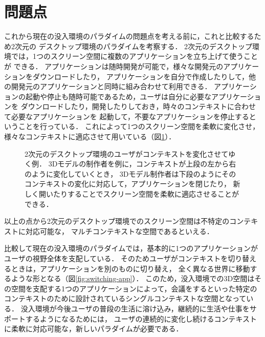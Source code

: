 \section{問題点}
\label{section:intro:problem}

これから現在の没入環境のパラダイムの問題点を考える前に，これと比較するため2次元の
デスクトップ環境のパラダイムを考察する．
2次元のデスクトップ環境では，1つのスクリーン空間に複数のアプリケーションを立ち上げて使うことが
できる．
アプリケーションは随時開発が可能で，様々な開発元のアプリケーションをダウンロードしたり，
アプリケーションを自分で作成したりして，他の開発元のアプリケーションと同時に組み合わせて利用できる．
アプリケーションの起動や停止も随時可能であるため，ユーザは自分に必要なアプリケーションを
ダウンロードしたり，開発したりしておき，時々のコンテキストに合わせて必要なアプリケーションを
起動して，不要なアプリケーションを停止するということを行っている．
これによって1つのスクリーン空間を柔軟に変化させ，様々なコンテキストに適応させて用いている（図\ref{fig:context-switch}）．

\begin{figure}[htbp]
  \centering
  \caption{
    2次元のデスクトップ環境のユーザがコンテキストを変化させてゆく例．
    3Dモデルの制作者を例に，コンテキストが上段の左から右のように変化していくとき，
    3Dモデル制作者は下段のようにそのコンテキストの変化に対応して，アプリケーションを閉じたり，
    新しく開いたりすることでスクリーン空間を柔軟に適応させることができる．
  }
  \label{fig:context-switch}
\end{figure}

以上の点から2次元のデスクトップ環境でのスクリーン空間は不特定のコンテキストに対応可能な，
マルチコンテキストな空間であるといえる．

比較して現在の没入環境のパラダイムでは，基本的に1つのアプリケーションがユーザの視野全体を支配している．
そのためユーザがコンテキストを切り替えるときは，アプリケーションを別のものに切り替え，
全く異なる世界に移動するような形となる（図\ref{fig:switching-app}）．
このため，没入環境での3D空間はその空間を支配する1つのアプリケーションによって，会議をするといった特定の
コンテキストのために設計されているシングルコンテキストな空間となっている．
没入環境が今後ユーザの普段の生活に溶け込み，継続的に生活や仕事をサポートするようになるためには，
ユーザの連続的に変化し続けるコンテキストに柔軟に対応可能な，新しいパラダイムが必要である．

